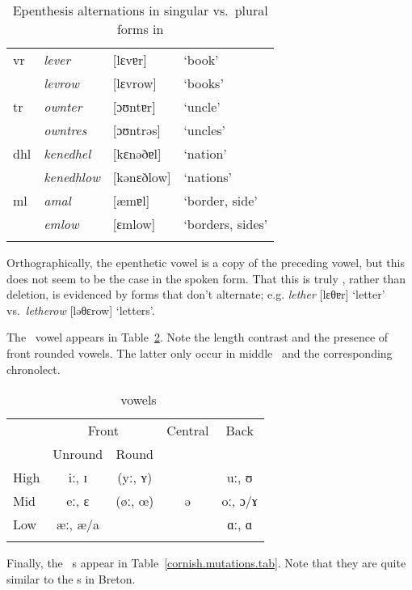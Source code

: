 \documentclass[output=paper,colorlinks,citecolor=brown]{langscibook}
\begin{document}
\begin{table}
\caption{Epenthesis alternations in singular vs.\ plural forms in \co}
\label{co.epenthesis.tab}
\begin{tabular}[t]{l>{\itshape}lll}
\lsptoprule
vr   & lever     & [lɛvɐr]    & `book'   \\
     & levrow    & [lɛvrow]   & `books' \\\addlinespace
tr   & ownter    & [ɔʊntɐr]   & `uncle'  \\
     & owntres   & [ɔʊntrəs]  & `uncles'  \\\addlinespace
dhl  & kenedhel  & [kɛnəðɐl]  & `nation'  \\
     & kenedhlow & [kənɛðlow] & `nations'  \\\addlinespace
ml   & amal      & [æmɐl]     & `border, side' \\
     & emlow     & [ɛmlow]    & `borders, sides' \\
\lspbottomrule
\end{tabular}
\end{table}

Orthographically, the epenthetic vowel is a copy of the preceding vowel, but this does not seem to be the case in the spoken form. That this is truly , rather than deletion, is evidenced by forms that don't alternate; e.g. \emph{lether} [lɛθɐr] `letter' vs.\ \emph{letherow} [ləθɛrow] `letters'.

The \co\ vowel  appears in Table~\ref{cornish.vowels.tab}. Note the length contrast and the presence of front rounded vowels. The latter only occur in middle \co\ and the corresponding chronolect.

\begin{table}
\caption{\co\ vowels}
\label{cornish.vowels.tab}
\begin{tabular}[t]{lcccc}
\lsptoprule
         & \multicolumn{2}{c}{Front} & Central & Back \\\cmidrule(lr){2-3}
         & Unround & Round \\
\midrule
High     & iː, ɪ    & (yː, ʏ)           &         & uː, ʊ \\
Mid      & eː, ɛ    & (øː, œ)           & ə       & oː, ɔ/ɤ \\
Low      & æː, æ/a  &                  &         & ɑː, ɑ  \\
\lspbottomrule
\end{tabular}
\end{table}

Finally, the \co\ \m s appear in Table~\ref{cornish.mutations.tab}. Note that they are quite similar to the \m s in Breton.
\end{document}
